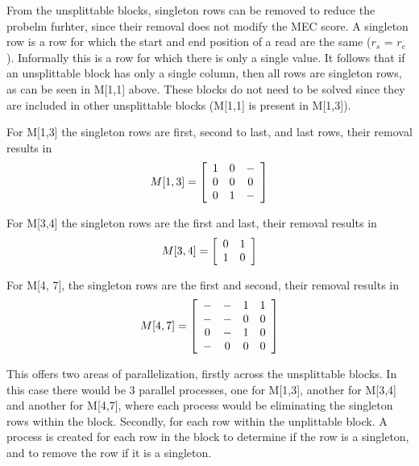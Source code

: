 \documentclass[10pt,twocolumn]{article}
\begin{document}
From the unsplittable blocks, singleton rows can be removed to reduce the probelm furhter, since their removal
does not modify the MEC score. A singleton row is a row for which the start and end position of a read are the
same ($r_s$ = $r_e$). Informally this is a row for which there is only a single value. It follows that if an
unsplittable block has only a single column, then all rows are singleton rows, as can be seen in M[1,1] above.
These blocks do not need to be solved since they are included in other unsplittable blocks (M[1,1] is present
in M[1,3]).

For M[1,3] the singleton rows are first, second to last, and last rows, their removal results in
\begin{equation*}
    M[1,3] = \left[ \begin{array}{c c c}
            1   & 0     & -     \\
            0   & 0     & 0     \\
            0   & 1     & - 
    \end{array} \right]
\end{equation*}

For M[3,4] the singleton rows are the first and last, their removal results in 
\begin{equation*}
    M[3,4] = \left[ \begin{array}{c c}
            0   & 1     \\
            1   & 0     
    \end{array} \right]
\end{equation*}

For M[4, 7], the singleton rows are the first and second, their removal results in
\begin{equation*}
    M[4,7] = \left[ \begin{array}{c c c c}
            -   & -     & 1     & 1     \\
            -   & -     & 0     & 0     \\
            0   & -     & 1     & 0     \\
            -   & 0     & 0     & 0     
    \end{array} \right]
\end{equation*}

This offers two areas of parallelization, firstly across the unsplittable blocks. In this case there would be
3 parallel processes, one for M[1,3], another for M[3,4] and another for M[4,7], where each process would be
eliminating the singleton rows within the block. Secondly, for each row within the unplittable block. A
process is created for each row in the block to determine if the row is a singleton, and to remove the row 
if it is a singleton.
\end{document}

